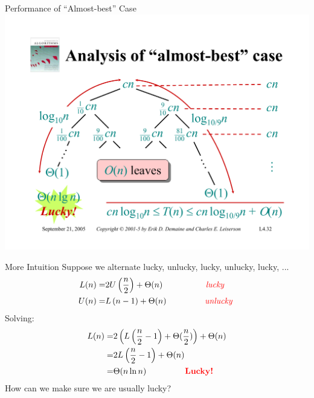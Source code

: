 \documentclass{beamer}
\begin{document}
\begin{frame}{Performance of ``Almost-best'' Case}
    \centering
    \includegraphics[width=\textwidth, trim={1.00cm 1.50cm 1.00cm 4.25cm}, clip]{pages/lec4_32}
\end{frame}

\begin{frame}{More Intuition}
    Suppose we alternate lucky, unlucky, lucky, unlucky, lucky, ...
    \begin{equation*}
        \begin{split}
            L(n) =& 2U\left(\frac{n}{2}\right) + \Theta(n) \text{\hspace{17mm} \textcolor{red}{\textit{lucky}} } \\
            U(n) =& L\left(n - 1\right) + \Theta(n) \text{\hspace{15mm} \textcolor{red}{\textit{unlucky}} } \\
        \end{split}
    \end{equation*}
    Solving:
    \begin{equation*}
        \begin{split}
            L(n) =& 2\left(L\left(\frac{n}{2} - 1 \right) + \Theta(\frac{n}{2})\right) + \Theta(n) \\
                 =& 2L\left(\frac{n}{2} - 1 \right) + \Theta(n) \\
                 =& \Theta(n \ln n) \text{\hspace{15mm} \textbf{\textcolor{red}{Lucky!}}}
        \end{split}
    \end{equation*}
    How can we make sure we are usually lucky?
\end{frame}
\end{document}

